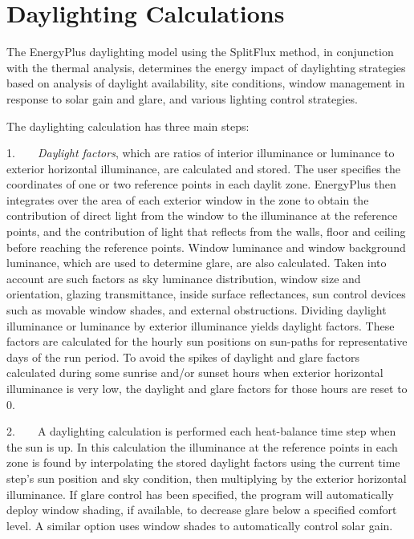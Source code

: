 \section{Daylighting Calculations}\label{daylighting-calculations}

The EnergyPlus daylighting model using the SplitFlux method, in conjunction with the thermal analysis, determines the energy impact of daylighting strategies based on analysis of daylight availability, site conditions, window management in response to solar gain and glare, and various lighting control strategies.

The daylighting calculation has three main steps:

1.~~~~\emph{Daylight factors}, which are ratios of interior illuminance or luminance to exterior horizontal illuminance, are calculated and stored. The user specifies the coordinates of one or two reference points in each daylit zone. EnergyPlus then integrates over the area of each exterior window in the zone to obtain the contribution of direct light from the window to the illuminance at the reference points, and the contribution of light that reflects from the walls, floor and ceiling before reaching the reference points. Window luminance and window background luminance, which are used to determine glare, are also calculated. Taken into account are such factors as sky luminance distribution, window size and orientation, glazing transmittance, inside surface reflectances, sun control devices such as movable window shades, and external obstructions. Dividing daylight illuminance or luminance by exterior illuminance yields daylight factors. These factors are calculated for the hourly sun positions on sun-paths for representative days of the run period. To avoid the spikes of daylight and glare factors calculated during some sunrise and/or sunset hours when exterior horizontal illuminance is very low, the daylight and glare factors for those hours are reset to 0.

2.~~~~A daylighting calculation is performed each heat-balance time step when the sun is up. In this calculation the illuminance at the reference points in each zone is found by interpolating the stored daylight factors using the current time step's sun position and sky condition, then multiplying by the exterior horizontal illuminance. If glare control has been specified, the program will automatically deploy window shading, if available, to decrease glare below a specified comfort level. A similar option uses window shades to automatically control solar gain.


